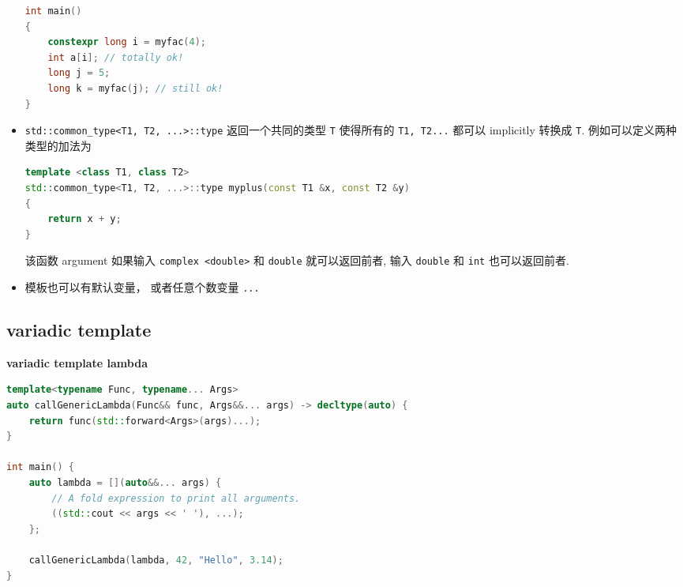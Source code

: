 \begin{itemize}
\begin{lstlisting}[language=cpp]
int main()
{
	constexpr long i = myfac(4);
	int a[i]; // totally ok!
	long j = 5;
	long k = myfac(j); // still ok!
}
\end{lstlisting}
\item \verb`std::common_type<T1, T2, ...>::type` 返回一个共同的类型 \verb`T` 使得所有的 \verb`T1, T2...` 都可以 implicitly 转换成 \verb`T`. 例如可以定义两种类型的加法为
\begin{lstlisting}[language=cpp]
template <class T1, class T2>
std::common_type<T1, T2, ...>::type myplus(const T1 &x, const T2 &y)
{
	return x + y;
}
\end{lstlisting}
该函数 argument 如果输入 \verb`complex <double>` 和 \verb`double` 就可以返回前者, 输入 \verb`double` 和 \verb`int` 也可以返回前者.
\item 模板也可以有默认变量， 或者任意个数变量 \verb|...|
\end{itemize}

\subsection{variadic template}
\textbf{variadic template lambda}

\begin{lstlisting}[language=cpp]
template<typename Func, typename... Args>
auto callGenericLambda(Func&& func, Args&&... args) -> decltype(auto) {
    return func(std::forward<Args>(args)...);
}

int main() {
    auto lambda = [](auto&&... args) {
        // A fold expression to print all arguments.
        ((std::cout << args << ' '), ...);
    };

    callGenericLambda(lambda, 42, "Hello", 3.14);
}
\end{lstlisting}
